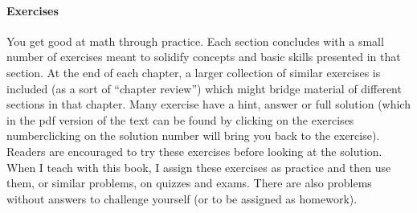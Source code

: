 \documentclass[10pt,]{book}
\theoremstyle{plain}
\theoremstyle{definition}
\theoremstyle{definition}
\theoremstyle{definition}
\numberwithin{equation}{chapter}
\begin{document}
\paragraph[{Exercises}]{Exercises}\hypertarget{paragraphs-4}{}
\hypertarget{p-12}{}%
You get good at math through practice. Each section concludes with a small number of exercises meant to solidify concepts and basic skills presented in that section. At the end of each chapter, a larger collection of similar exercises is included (as a sort of ``chapter review'') which might bridge material of different sections in that chapter. Many exercise have a hint, answer or full solution (which in the pdf version of the text can be found by clicking on the exercises number\textemdash{}clicking on the solution number will bring you back to the exercise). Readers are encouraged to try these exercises before looking at the solution. When I teach with this book, I assign these exercises as practice and then use them, or similar problems, on quizzes and exams.  There are also problems without answers to challenge yourself (or to be assigned as homework).%
\setcounter{tocdepth}{2}
\renewcommand*\contentsname{Contents}
\tableofcontents
\mainmatter
\typeout{************************************************}
\typeout{************************************************}
\end{document}
